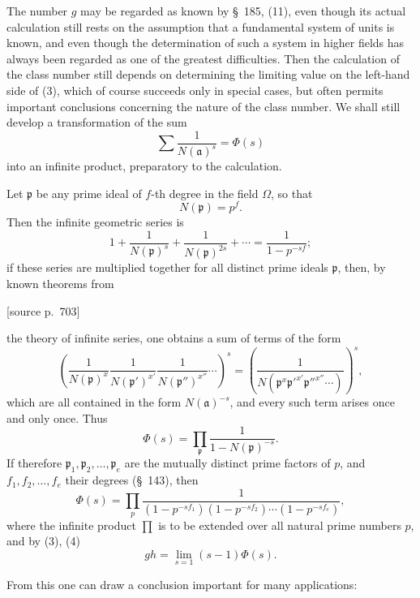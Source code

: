\documentclass[11pt]{article}
\newcommand{\srcpage}[1]{\par\medskip\noindent\textsf{[source p.~#1]}\par\smallskip}
\begin{document}
The number $g$ may be regarded as known by \S~185, (11), even though its actual calculation still rests on the assumption that a fundamental system of units is known, and even though the determination of such a system in higher fields has always been regarded as one of the greatest difficulties. Then the calculation of the class number still depends on determining the limiting value on the left-hand side of (3), which of course succeeds only in special cases, but often permits important conclusions concerning the nature of the class number. We shall still develop a transformation of the sum
\begin{equation}
\sum\frac1{N(\mathfrak a)^s}=\Phi(s)
\tag{4}
\end{equation}
into an infinite product, preparatory to the calculation.

Let $\mathfrak p$ be any prime ideal of $f$-th degree in the field $\Omega$, so that
\[
N(\mathfrak p)=p^f.
\]
Then the infinite geometric series is
\[
1+\frac1{N(\mathfrak p)^s}+\frac1{N(\mathfrak p)^{2s}}+\cdots
=\frac1{1-p^{-sf}};
\]
if these series are multiplied together for all distinct prime ideals $\mathfrak p$, then, by known theorems from

\srcpage{703}
the theory of infinite series, one obtains a sum of terms of the form
\[
\left(\frac1{N(\mathfrak p)^x}\frac1{N(\mathfrak p')^{x'}}\frac1{N(\mathfrak p'')^{x''}}\cdots\right)^s
=\left(\frac1{N(\mathfrak p^x\mathfrak p'^{x'}\mathfrak p''^{x''}\cdots)}\right)^s,
\]
which are all contained in the form $N(\mathfrak a)^{-s}$, and every such term arises once and only once. Thus
\begin{equation}
\Phi(s)=\prod_{\mathfrak p}\frac1{1-N(\mathfrak p)^{-s}}.
\tag{5}
\end{equation}
If therefore $\mathfrak p_1,\mathfrak p_2,\ldots,\mathfrak p_e$ are the mutually distinct prime factors of $p$, and $f_1,f_2,\ldots,f_e$ their degrees (\S~143), then
\begin{equation}
\Phi(s)=\prod_p
\frac1{(1-p^{-sf_1})(1-p^{-sf_2})\cdots(1-p^{-sf_e})},
\tag{6}
\end{equation}
where the infinite product $\prod$ is to be extended over all natural prime numbers $p$, and by (3), (4)
\begin{equation}
gh=\lim_{s=1}(s-1)\Phi(s).
\tag{7}
\end{equation}

From this one can draw a conclusion important for many applications:
\end{document}
